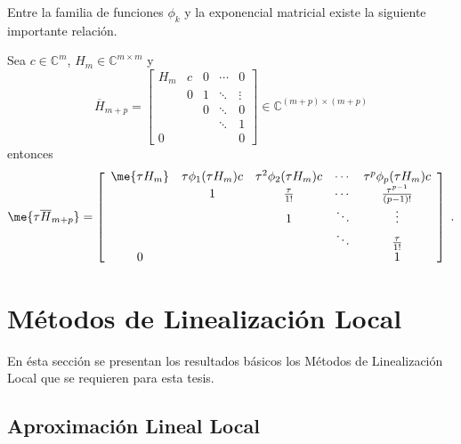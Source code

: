 Entre la familia de funciones $\phi_k$ y la exponencial matricial existe la siguiente importante relaci\'on.

\begin{theorem}\label{exp-phi}
    \cite{Sidje98} Sea $c\in\mathbb{C}^{m}$, $H_m\in\mathbb{C}^{m\times m}$ y 
    \begin{equation}
    \overline{H}_{m+p} = \left[\begin{array}{ccccc}
    H_m & c & 0 & \cdots & 0 \\
          & 0 & 1 & \ddots & \vdots \\
          &   & 0 & \ddots & 0 \\
          &   &   & \ddots & 1 \\
       0  &   &   &        & 0
    \end{array}\right]\in \mathbb{C}^{(m+p)\times(m+p)}
    \end{equation}
    entonces
     \begin{equation}
    \me{\tau\overline{H}_{m+p}} = \left[\begin{array}{ccccc}
    \me{\tau H_m} & \tau\phi_1(\tau H_m)c & \tau^{2}\phi_2(\tau H_m)c & \cdots & \tau^{p}\phi_p(\tau H_m)c \\
      & 1 & \frac{\tau}{1!} & \cdots & \frac{\tau^{p-1}}{(p-1)!} \\
      &   & 1 & \ddots & \vdots \\
      &   &   & \ddots & \frac{\tau}{1!} \\
    0 &   &   &        & 1
    \end{array}\right]  \;.
    \end{equation}
\end{theorem} 


\section{M\'{e}todos de Linealizaci\'{o}n Local}

En \'esta sección se presentan los resultados básicos los M\'{e}todos de Linealizaci\'{o}n Local que se requieren para esta tesis.

\subsection{Aproximaci\'{o}n Lineal Local \label{section:REV-LL}}

